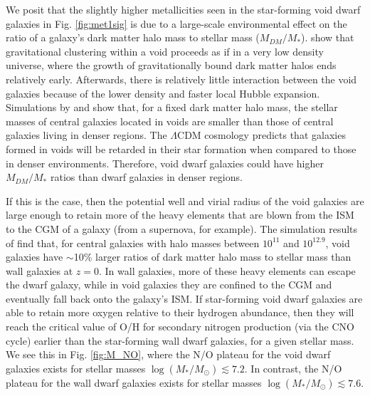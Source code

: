 We posit that the slightly higher metallicities seen in the star-forming void 
dwarf galaxies in Fig. \ref{fig:met1sig} is due to a large-scale environmental 
effect on the ratio of a galaxy's dark matter halo mass to stellar mass 
($M_{DM}/M_*$).  \cite{Goldberg04} show that gravitational clustering within a 
void proceeds as if in a very low density universe, where the growth of 
gravitationally bound dark matter halos ends relatively early.  Afterwards, 
there is relatively little interaction between the void galaxies because of the 
lower density and faster local Hubble expansion.  Simulations by \cite{Jung14} 
and \cite{Tonnesen15} show that, for a fixed dark matter halo mass, the stellar 
masses of central galaxies located in voids are smaller than those of central 
galaxies living in denser regions.  The $\Lambda$CDM cosmology predicts that 
galaxies formed in voids will be retarded in their star formation when compared 
to those in denser environments.  Therefore, void dwarf galaxies could have 
higher $M_{DM}/M_*$ ratios than dwarf galaxies in denser regions.

If this is the case, then the potential well and virial radius of the void 
galaxies are large enough to retain more of the heavy elements that are blown 
from the ISM to the CGM of a galaxy (from a supernova, for example).  The 
simulation results of \cite{Tonnesen15} find that, for central galaxies with 
halo masses between $10^{11}$ and $10^{12.9}$, void galaxies have $\sim$10\% 
larger ratios of dark matter halo mass to stellar mass than wall galaxies at 
$z = 0$.  In wall galaxies, more of these heavy elements can escape the dwarf 
galaxy, while in void galaxies they are confined to the CGM and eventually fall 
back onto the galaxy's ISM.  If star-forming void dwarf galaxies are able to 
retain more oxygen relative to their hydrogen abundance, then they will reach 
the critical value of O/H for secondary nitrogen production (via the CNO cycle) 
earlier than the star-forming wall dwarf galaxies, for a given stellar mass.  We 
see this in Fig. \ref{fig:M_NO}, where the N/O plateau for the void dwarf 
galaxies exists for stellar masses $\log(M_*/M_\odot) \lesssim 7.2$.  In 
contrast, the N/O plateau for the wall dwarf galaxies exists for stellar masses 
$\log(M_*/M_\odot) \lesssim 7.6$.

